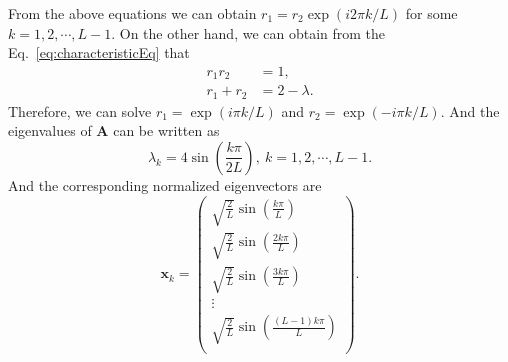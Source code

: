 From the above equations we can obtain $r_1 = r_2 \exp(i 2\pi k /L)$ for some $k = 1, 2, \cdots, L-1$. On the other hand, we can obtain from the Eq.~\eqref{eq:characteristicEq} that
\begin{subequations}
    \begin{align}
        r_1 r_2 & = 1, \\
        r_1 + r_2  & = 2-\lambda.
    \end{align}
\end{subequations}
Therefore, we can solve $r_1 = \exp(i \pi k /L)$ and $r_2 = \exp(-i \pi k/L)$. And the eigenvalues of $\mathbf{A}$ can be written as
\begin{equation}
   \lambda_k = 4\sin(\frac{k\pi}{2L}),~k=1, 2,\cdots, L-1.
\end{equation}
And the corresponding normalized eigenvectors are
\begin{equation}
    \mathbf{x}_k = 
        \begin{pmatrix}
            \sqrt{\frac{2}{L}}\sin\left(\frac{k\pi}{L}\right) \\
            \sqrt{\frac{2}{L}}\sin\left(\frac{2k\pi}{L}\right) \\
            \sqrt{\frac{2}{L}}\sin\left(\frac{3k\pi}{L}\right) \\
            \vdots\\
            \sqrt{\frac{2}{L}}\sin\left(\frac{(L-1)k\pi}{L}\right) \\
            
        \end{pmatrix}.
\end{equation}



